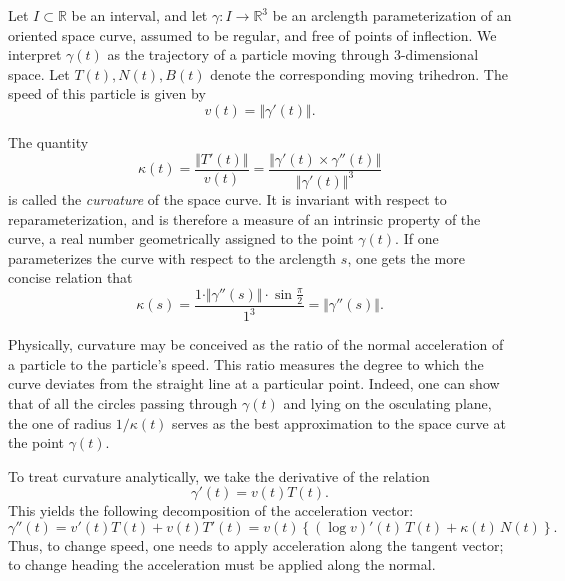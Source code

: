 \documentclass{article}
\newcommand{\reals}{\mathbb{R}}
\begin{document}
Let $I\subset\reals$ be an interval, and let $\gamma:I\to\reals^3$ be
an arclength parameterization of an oriented space curve, assumed to
be regular, and free of points of inflection.  We interpret $\gamma(t)$ as
the trajectory of a particle moving through 3-dimensional space.  Let
$T(t), N(t), B(t)$ denote the corresponding moving trihedron.  The
speed of this particle is given by 
\[
   v(t) = \Vert \gamma'(t) \Vert.
\]

The quantity
\[ \kappa(t) = \frac{\Vert T'(t)\Vert}{v(t)} = 
               \frac{\Vert \gamma'(t)\times \gamma''(t)\Vert}
                     {\Vert \gamma'(t)\Vert^3}
\]
is called the
\emph{curvature} of the space curve.  It is invariant with respect to
reparameterization, and is therefore a measure of an intrinsic property
of the curve, a real number geometrically assigned to the point
$\gamma(t)$. If one parameterizes the curve with respect to the arclength $s$, one gets the more concise relation that
\[
   \kappa(s) = \frac{1\cdot\Vert\gamma''(s)\Vert\cdot\sin\frac{\pi}{2}}{1^3} 
             = \Vert\gamma''(s)\Vert.
\]

Physically, curvature may be conceived as the ratio of the normal
acceleration of a particle to the particle's speed.  This ratio
measures the degree to which the curve deviates from the straight line
at a particular point. Indeed, one can show
that of all the circles passing through $\gamma(t)$ and lying on the
osculating plane, the one of radius $1/\kappa(t)$ serves as the best
approximation to the space curve at the point $\gamma(t)$.

To treat curvature analytically, we take the derivative of the relation
\[ \gamma'(t) = v(t) T(t).\]
This yields the following
decomposition of the acceleration vector:
\[
  \gamma''(t) = v'(t) T(t) + v(t) T'(t)
              = v(t) \left\{ (\log v)'(t)\, T(t) + \kappa(t)\, N(t)\right\}.
\]
Thus, to change speed,
one needs to apply acceleration along the tangent vector; to change
heading the acceleration must be applied along the normal.
\end{document}
